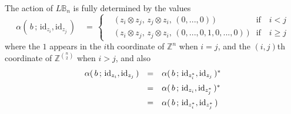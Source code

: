\documentclass{amsbook} %
\numberwithin{section}{chapter}
\begin{document}
\begin{prop} \label{invbraidact} The action of $L\mathbb{B}_n$ is fully determined by the values
\[ \alpha( \, b \, ; \, \mathrm{id}_{z_i}, \mathrm{id}_{z_j} \, ) \quad = \, 
		\begin{cases}
			\quad \big( \, z_i \otimes z_j, \, z_j \otimes z_i, \, (0, ..., 0) \, \big) & \text{if} \quad i < j \\
			\quad \big( \, z_i \otimes z_j, \, z_j \otimes z_i, \, (0,...,0, 1, 0,...,0) \, \big) & \text{if} \quad i \ge j
		\end{cases} 
\]
where the $1$ appears in the $i$th coordinate of $\mathbb{Z}^{n}$ when $i=j$, and the $(i,j)$th coordinate of $\mathbb{Z}^{{n}\choose{2}}$ when $i>j$, and also
\[ \begin{array}{rll} 
			\alpha( \, b \, ; \, \mathrm{id}_{z_i}, \mathrm{id}_{z_j} \, ) & = & \alpha( \, b \, ; \, \mathrm{id}_{z_i^*}, \mathrm{id}_{z_j} \, )^* \\[\medskipamount]
			& = & \alpha( \, b \, ; \, \mathrm{id}_{z_i}, \mathrm{id}_{z_j^*} \, )^* \\[\medskipamount]
			& = & \alpha( \, b \, ; \, \mathrm{id}_{z_i^*}, \mathrm{id}_{z_j^*} \, )
		\end{array}
\]
\end{prop}
\end{document}
